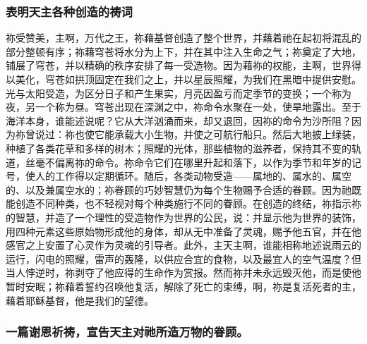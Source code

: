 
\subsubsection{表明天主各种创造的祷词}

祢受赞美，主啊，万代之王，祢藉基督创造了整个世界，并藉着祂在起初将混乱的部分整顿有序；祢藉穹苍将水分为上下，并在其中注入生命之气；祢奠定了大地，铺展了穹苍，并以精确的秩序安排了每一受造物。因为藉祢的权能，主啊，世界得以美化，穹苍如拱顶固定在我们之上，并以星辰照耀，为我们在黑暗中提供安慰。光与太阳受造，为区分日子和产生果实，月亮因盈亏而定季节的变换；一个称为夜，另一个称为昼。穹苍出现在深渊之中，祢命令水聚在一处，使旱地露出。至于海洋本身，谁能述说呢？它从大洋汹涌而来，却又退回，因祢的命令为沙所阻？因为祢曾说过：祢也使它能承载大小生物，并使之可航行船只。然后大地披上绿装，种植了各类花草和多样的树木；照耀的光体，那些植物的滋养者，保持其不变的轨道，丝毫不偏离祢的命令。祢命令它们在哪里升起和落下，以作为季节和年岁的记号，使人的工作得以定期循环。随后，各类动物受造——属地的、属水的、属空的、以及兼属空水的；祢眷顾的巧妙智慧仍为每个生物赐予合适的眷顾。因为祂既能创造不同种类，也不轻视对每个种类施行不同的眷顾。在创造的终结，祢指示祢的智慧，并造了一个理性的受造物作为世界的公民，说：并显示他为世界的装饰，用四种元素这些原始物形成他的身体，却从无中准备了灵魂，赐予他五官，并在他感官之上安置了心灵作为灵魂的引导者。此外，主天主啊，谁能相称地述说雨云的运行，闪电的照耀，雷声的轰隆，以供应合宜的食物，以及最宜人的空气温度？但当人悖逆时，祢剥夺了他应得的生命作为赏报。然而祢并未永远毁灭他，而是使他暂时安眠；祢藉着誓约召唤他复活，解除了死亡的束缚，啊，祢是复活死者的主，藉着耶稣基督，他是我们的望德。\par


\subsubsection{一篇谢恩祈祷，宣告天主对祂所造万物的眷顾。}

